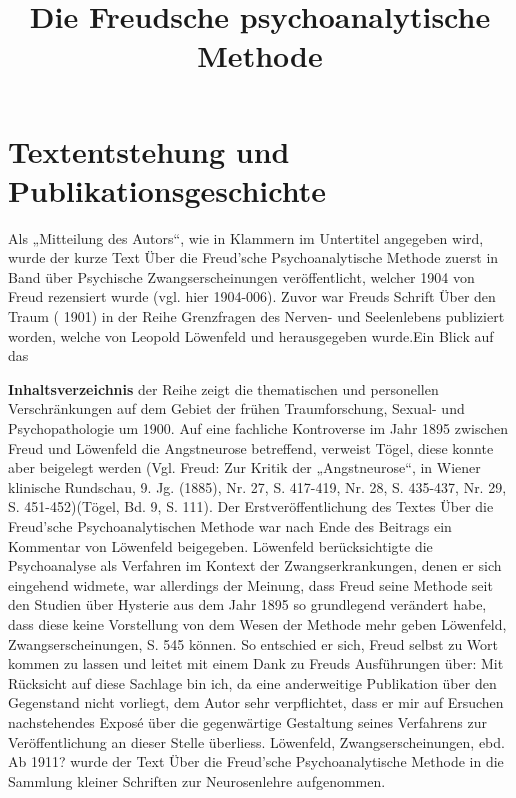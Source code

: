 \documentclass[twoside=true,titlepage=false,open=any, parskip=never, fontsize=10pt, headings=small, chapterprefix=false, appendixprefix=false]{scrbook}
\begin{document}
        \title{Die Freudsche psychoanalytische Methode}
        
        \beginnumbering
        
            \section{Textentstehung und Publikationsgeschichte}
             Als „Mitteilung des Autors“, wie in Klammern im Untertitel angegeben wird, wurde
                  der kurze Text Über die Freud’sche
                     Psychoanalytische Methode zuerst in  Band über Psychische Zwangserscheinungen veröffentlicht, welcher 1904 von Freud rezensiert wurde (vgl. hier 1904-006). Zuvor war Freuds
                  Schrift Über den Traum (                  1901) in
                  der Reihe Grenzfragen des Nerven- und Seelenlebens
                  publiziert worden, welche von Leopold Löwenfeld und  herausgegeben wurde.Ein Blick auf das
                  
                     \textbf{Inhaltsverzeichnis}
                   der Reihe zeigt die thematischen und
                  personellen Verschränkungen auf dem Gebiet der frühen Traumforschung, Sexual- und
                  Psychopathologie um 1900. Auf eine fachliche Kontroverse
                  im Jahr 1895 zwischen Freud und Löwenfeld die
                  Angstneurose betreffend, verweist Tögel, diese konnte aber beigelegt werden (Vgl.
                  Freud: Zur Kritik der „Angstneurose“,
                  in Wiener klinische Rundschau, 9. Jg. (1885), Nr. 27, S. 417-419, Nr. 28, S.
                  435-437, Nr. 29, S. 451-452)(Tögel, Bd. 9,
                     S. 111). Der Erstveröffentlichung des Textes Über die Freud’sche Psychoanalytischen Methode
                  war nach Ende des Beitrags ein Kommentar von Löwenfeld beigegeben. Löwenfeld
                  berücksichtigte die Psychoanalyse als Verfahren im Kontext der Zwangserkrankungen,
                  denen er sich eingehend widmete, war allerdings der Meinung, dass Freud seine
                  Methode seit den Studien über Hysterie aus dem Jahr 1895
                  so grundlegend verändert habe, dass diese keine Vorstellung von dem Wesen
                     der Methode mehr geben
                  Löwenfeld, Zwangserscheinungen, S. 545
                  können. So entschied er sich, Freud selbst zu Wort kommen zu lassen und leitet mit
                  einem Dank zu Freuds Ausführungen über: Mit Rücksicht auf diese Sachlage
                     bin ich, da eine anderweitige Publikation über den Gegenstand nicht vorliegt,
                     dem Autor sehr verpflichtet, dass er mir auf Ersuchen nachstehendes Exposé über
                     die gegenwärtige Gestaltung seines Verfahrens zur Veröffentlichung an dieser
                     Stelle überliess.
                  Löwenfeld, Zwangserscheinungen, ebd. Ab 1911? wurde der Text Über die Freud’sche Psychoanalytische Methode in die Sammlung kleiner
                     Schriften zur Neurosenlehre aufgenommen. 
        \beforeeledchapter
    
\end{document}
